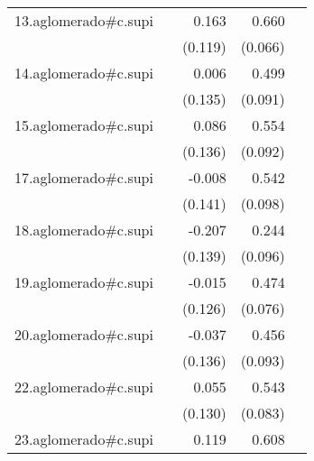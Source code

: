 {\begin{longtable}{l*{4}{D{.}{.}{-1}}}
\addlinespace
13.aglomerado#c.supi&                     &       0.163         &       0.660\sym{***}&                     \\
            &                     &     (0.119)         &     (0.066)         &                     \\
\addlinespace
14.aglomerado#c.supi&                     &       0.006         &       0.499\sym{***}&                     \\
            &                     &     (0.135)         &     (0.091)         &                     \\
\addlinespace
15.aglomerado#c.supi&                     &       0.086         &       0.554\sym{***}&                     \\
            &                     &     (0.136)         &     (0.092)         &                     \\
\addlinespace
17.aglomerado#c.supi&                     &      -0.008         &       0.542\sym{***}&                     \\
            &                     &     (0.141)         &     (0.098)         &                     \\
\addlinespace
18.aglomerado#c.supi&                     &      -0.207         &       0.244\sym{*}  &                     \\
            &                     &     (0.139)         &     (0.096)         &                     \\
\addlinespace
19.aglomerado#c.supi&                     &      -0.015         &       0.474\sym{***}&                     \\
            &                     &     (0.126)         &     (0.076)         &                     \\
\addlinespace
20.aglomerado#c.supi&                     &      -0.037         &       0.456\sym{***}&                     \\
            &                     &     (0.136)         &     (0.093)         &                     \\
\addlinespace
22.aglomerado#c.supi&                     &       0.055         &       0.543\sym{***}&                     \\
            &                     &     (0.130)         &     (0.083)         &                     \\
\addlinespace
23.aglomerado#c.supi&                     &       0.119         &       0.608\sym{***}&                     \\

\end{longtable}}

